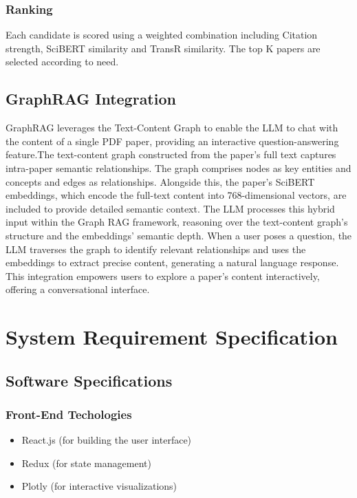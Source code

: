 \documentclass[a4paper,12pt]{article}
\begin{document}
\subsubsection{Ranking}
Each candidate is scored using a weighted combination including Citation strength,
SciBERT similarity and TransR similarity. The top K papers are selected according
to need.

\subsection{GraphRAG Integration}
GraphRAG leverages the Text-Content Graph to enable the LLM to chat with the content
of a single PDF paper, providing an interactive question-answering feature.The
text-content graph constructed from the paper’s full text captures intra-paper
semantic relationships. The graph comprises nodes as key entities and concepts
and edges as relationships. Alongside this, the paper’s SciBERT embeddings, which
encode the full-text content into 768-dimensional vectors, are included to provide
detailed semantic context. The LLM processes this hybrid input within the Graph RAG
framework, reasoning over the text-content graph’s structure and the embeddings’
semantic depth. When a user poses a question, the LLM traverses the graph to identify
relevant relationships and uses the embeddings to extract precise content, generating
a natural language response. This integration empowers users to explore a paper’s
content interactively, offering a conversational interface.
\newpage

\section{System Requirement Specification}
\subsection{Software Specifications}
\subsubsection{Front-End Techologies}
\begin{itemize}
    \item React.js (for building the user interface)
    \vspace{-10pt}
    \item Redux (for state management)
    \vspace{-10pt}
    \item Plotly (for interactive visualizations)
\end{itemize}
\end{document}
